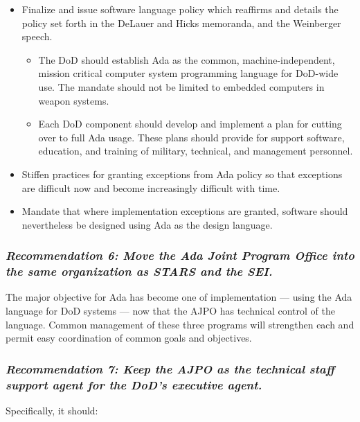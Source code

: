 \documentclass[12pt,final]{article}
\begin{document}
\begin{itemize}
    \item Finalize and issue software language policy which reaffirms and
        details the policy set forth in the DeLauer and Hicks memoranda, and
        the Weinberger speech.
\begin{itemize}
    \item The DoD should establish Ada as the common, machine-independent,
        mission critical computer system programming language for DoD-wide use.
        The mandate should not be limited to embedded computers in weapon
        systems.
    \item Each DoD component should develop and implement a plan for cutting
        over to full Ada usage. These plans should provide for support
        software, education, and training of military, technical, and
        management personnel.
\end{itemize}
    \item Stiffen practices for granting exceptions from Ada policy so that
        exceptions are difficult now and become increasingly difficult with
        time.
    \item Mandate that where implementation exceptions are granted, software
        should nevertheless be designed using Ada as the design language.
\end{itemize}

\label{rec:6}
\subsubsection*{\textit{Recommendation 6: Move the Ada Joint Program Office
into the same organization as STARS and the SEI.}}

The major objective for Ada has become one of implementation — using the Ada
language for DoD systems — now that the AJPO has technical control of the
language. Common management of these three programs will strengthen each and
permit easy coordination of common goals and objectives.

\label{rec:7}
\subsubsection*{\textit{Recommendation 7: Keep the AJPO as the technical staff support agent
for the DoD’s executive agent.}}

Specifically, it should:
\end{document}
